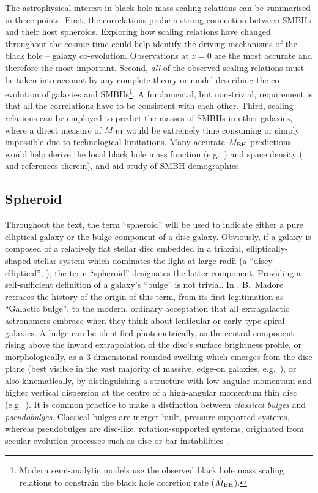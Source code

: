 The astrophysical interest in black hole mass scaling relations can be summarised in three points.
First, the correlations probe a strong connection between SMBHs and their host spheroids.
Exploring how scaling relations have changed throughout the cosmic time could help identify
the driving mechanisms of the black hole -- galaxy co-evolution.
Observations at $z=0$ are the most accurate and therefore the most important.
Second, \emph{all} of the observed scaling relations must be taken into account by any complete theory or model describing 
the co-evolution of galaxies and SMBHs\footnote{Modern semi-analytic models 
use the observed black hole mass scaling relations 
to constrain the black hole accretion rate ($\dot{M}_{\rm BH}$).}.
A fundamental, but non-trivial, requirement is that all the correlations have to be consistent with each other.
Third, scaling relations can be employed to predict the masses of SMBHs in other galaxies, where a direct
measure of $M_{\rm BH}$ would be extremely time consuming or simply impossible due to technological 
limitations.
Many accurate $M_{\rm BH}$ predictions would help derive 
the local black hole mass function (e.g.~\citealt{salucci1999,graham2007smbhmassfunction}) 
and space density (\citealt{grahamdriver2007smbhmassdensity} and references therein),
and aid study of SMBH demographics. \\

\subsection{Spheroid}
\label{sec:spheroid}
Throughout the text, the term ``spheroid'' will be used to indicate either a pure elliptical galaxy  
or the bulge component of a disc galaxy. 
Obviously, if a galaxy is composed of a relatively flat stellar disc 
embedded in a triaxial, elliptically-shaped stellar system which dominates the light at large radii 
(a ``discy elliptical'', \citealt{michard1984,nieto1988}), 
the term ``spheroid'' designates the latter component. 
Providing a self-sufficient definition of a galaxy's ``bulge'' is not trivial. 
In \cite{laurikainen2016review}, B.~Madore retraces the history of the origin of this term, 
from its first legitimation as ``Galactic bulge'', 
to the modern, ordinary acceptation that all extragalactic astronomers embrace 
when they think about lenticular or early-type spiral galaxies. 
A bulge can be identified photometrically, 
as the central component rising above the inward extrapolation of the disc's surface brightness profile, 
or morphologically, 
as a 3-dimensional rounded swelling which emerges from the disc plane 
(best visible in the vast majority of massive, edge-on galaxies, e.g.~\citealt{kautsch2006}), 
or also kinematically, 
by distinguishing a structure with low-angular momentum and higher vertical dispersion
at the centre of a high-angular momentum thin disc (e.g.~\citealt{fabricius2014}). 
It is common practice to make a distinction between \emph{classical bulges} and \emph{pseudobulges}. 
Classical bulges are merger-built, pressure-supported systems, 
whereas pseudobulges are disc-like, rotation-supported systems, 
originated from secular evolution processes such as disc or bar instabilities 
\citep{kormendy1982,kormendykennicutt2004}. 


